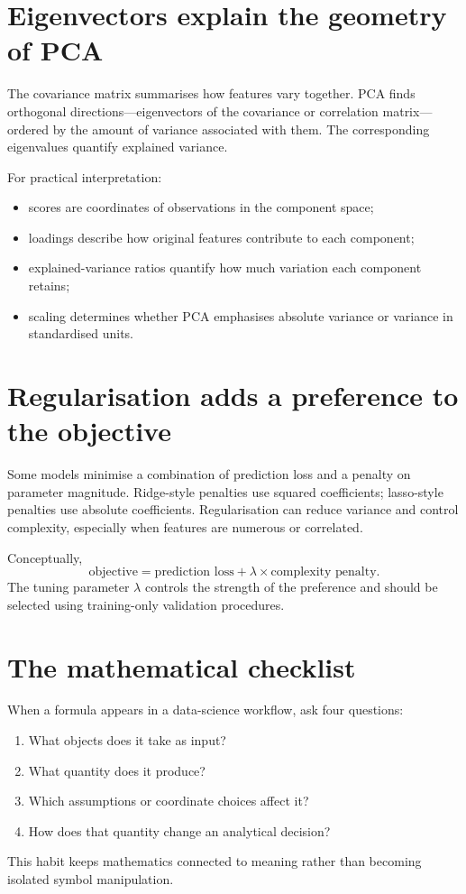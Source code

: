 \section{Eigenvectors explain the geometry of PCA}
The covariance matrix summarises how features vary together. PCA finds orthogonal directions---eigenvectors of the covariance or correlation matrix---ordered by the amount of variance associated with them. The corresponding eigenvalues quantify explained variance.

For practical interpretation:
\begin{itemize}
  \item scores are coordinates of observations in the component space;
  \item loadings describe how original features contribute to each component;
  \item explained-variance ratios quantify how much variation each component retains;
  \item scaling determines whether PCA emphasises absolute variance or variance in standardised units.
\end{itemize}

\section{Regularisation adds a preference to the objective}
Some models minimise a combination of prediction loss and a penalty on parameter magnitude. Ridge-style penalties use squared coefficients; lasso-style penalties use absolute coefficients. Regularisation can reduce variance and control complexity, especially when features are numerous or correlated.

Conceptually,
\[
\text{objective}=\text{prediction loss}+\lambda\times\text{complexity penalty}.
\]
The tuning parameter $\lambda$ controls the strength of the preference and should be selected using training-only validation procedures.

\section{The mathematical checklist}
When a formula appears in a data-science workflow, ask four questions:
\begin{enumerate}
  \item What objects does it take as input?
  \item What quantity does it produce?
  \item Which assumptions or coordinate choices affect it?
  \item How does that quantity change an analytical decision?
\end{enumerate}
This habit keeps mathematics connected to meaning rather than becoming isolated symbol manipulation.

